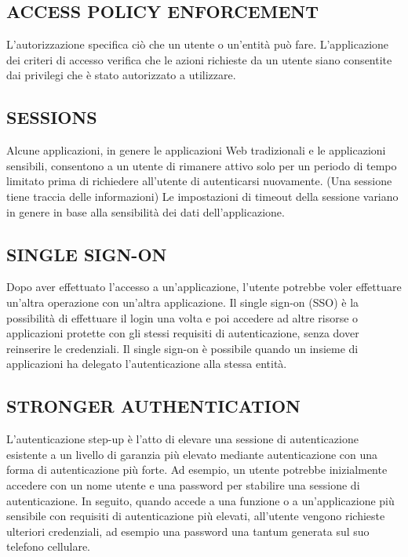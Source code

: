 \subsection{ACCESS POLICY ENFORCEMENT}

L'autorizzazione specifica ciò che un utente o un'entità può fare. L'applicazione
dei criteri di accesso verifica che le azioni richieste da un utente siano
consentite dai privilegi che è stato autorizzato a utilizzare.

\subsection{SESSIONS}

Alcune applicazioni, in genere le applicazioni Web tradizionali e le applicazioni
sensibili, consentono a un utente di rimanere attivo solo per un periodo di tempo
limitato prima di richiedere all'utente di autenticarsi nuovamente.
(Una sessione tiene traccia delle informazioni)
Le impostazioni di timeout della sessione variano in genere in base alla
sensibilità dei dati dell'applicazione.

\subsection{SINGLE SIGN-ON}

Dopo aver effettuato l'accesso a un'applicazione, l'utente potrebbe voler
effettuare un'altra operazione con un'altra applicazione.
Il single sign-on (SSO) è la possibilità di effettuare il login una volta e poi
accedere ad altre risorse o applicazioni protette con gli stessi requisiti di
autenticazione, senza dover reinserire le credenziali.
Il single sign-on è possibile quando un insieme di applicazioni ha delegato
l'autenticazione alla stessa entità.

\subsection{STRONGER AUTHENTICATION}

L'autenticazione step-up è l'atto di elevare una sessione di autenticazione
esistente a un livello di garanzia più elevato mediante
autenticazione con una forma di autenticazione più forte.
Ad esempio, un utente potrebbe inizialmente accedere con un nome utente e una
password per stabilire una sessione di autenticazione.
In seguito, quando accede a una funzione o a un'applicazione più sensibile
con requisiti di autenticazione più elevati, all'utente vengono richieste
ulteriori credenziali, ad esempio una password una tantum generata sul suo
telefono cellulare.

